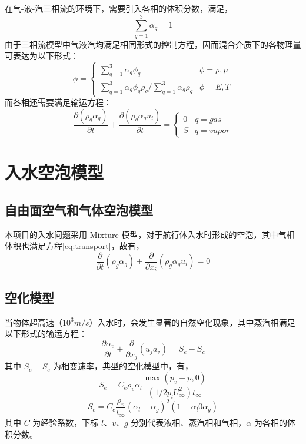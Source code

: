 在气-液-汽三相流的环境下，需要引入各相的体积分数，满足，
\begin{equation}
  \sum _{q = 1} ^3 \alpha _q = 1
\end{equation}
由于三相流模型中气液汽均满足相同形式的控制方程，因而混合介质下的各物理量可表达为以下形式：
\begin{equation}
  \phi = \begin{cases}
    \sum _{q = 1} ^3 \alpha_q \phi_q & \phi = \rho, \mu \\
    \sum _{q = 1} ^3 \alpha_q \phi_q \rho_q \bigg/ \sum _{q = 1} ^3 \alpha _q \rho _q & \phi = E, T
  \end{cases}
\end{equation}
而各相还需要满足输运方程：
\begin{equation}
  \frac {\partial (\rho _q \alpha _q)} {\partial t} + \frac {\partial (\rho _q \alpha _q u_i)}{\partial t} = \begin{cases}
    0 & q = gas \\
    S & q = vapor
  \end{cases}
  \label{eq:transport}
\end{equation}

\section{入水空泡模型}

\subsection{自由面空气和气体空泡模型}
本项目的入水问题采用 Mixture 模型，对于航行体入水时形成的空泡，其中气相体积也满足方程\ref{eq:transport}，故有，
\begin{equation}
  \frac \partial {\partial t} (\rho _g \alpha_g) + \frac \partial {\partial x_i} (\rho _g \alpha _g u_i) = 0
\end{equation}

\subsection{空化模型}
当物体超高速（$10^3 m/s$）入水时，会发生显著的自然空化现象，其中蒸汽相满足以下形式的输运方程：
\begin{equation}
  \frac {\partial \alpha _v}{\partial t} + \frac \partial {\partial x_j} (u_j a_v) = S_e - S_c
\end{equation}
其中 $S_e - S_c$ 为相变速率，典型的空化模型中，有，
\begin{equation}
  S_e = C_e \rho _v \alpha _l \frac {\max (p_v - p, 0)} {(1 / 2 p_l U _{\infty} ^2) t _{\infty}}
\end{equation}
\begin{equation}
  S_c = C_c \frac {\rho _v}{t _{\infty}} (\alpha _l - \alpha _g) ^2 (1 - \alpha_l 0 \alpha_g)
\end{equation}
其中 $C$ 为经验系数，下标 $l$、$v$、$g$ 分别代表液相、蒸汽相和气相，$\alpha$ 为各相的体积分数。